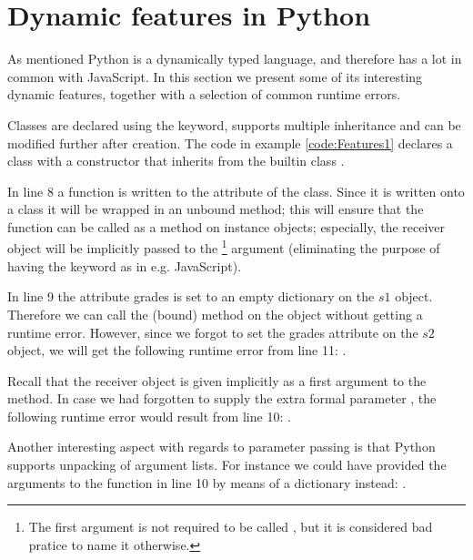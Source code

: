 \chapter{Dynamic features in Python}
\label{Features}
As mentioned Python is a dynamically typed language, and therefore has a lot in common with JavaScript. In this section we present some of its interesting dynamic features, together with a selection of common runtime errors.

Classes are declared using the  keyword, supports multiple inheritance and can be modified further after creation. 
The code in example \ref{code:Features1} declares a class  with a constructor that inherits from the builtin class .

In line 8 a function  is written to the  attribute of the  class. Since it is written onto a class it will be wrapped in an unbound method; this will ensure that the function can be called as a method on instance objects; especially, the receiver object will be implicitly passed to the \footnote{The first argument is not required to be called , but it is considered bad pratice to name it otherwise.} argument (eliminating the purpose of having the  keyword as in e.g. JavaScript).

In line 9 the attribute grades is set to an empty dictionary on the $s1$ object. Therefore we can call the (bound) method  on the  object without getting a runtime error. However, since we forgot to set the grades attribute on the $s2$ object, we will get the following runtime error from line 11: . 

Recall that the receiver object is given implicitly as a first argument to the  method. 
In case we had forgotten to supply the extra formal parameter , the following runtime error would result from line 10:
. 

Another interesting aspect with regards to parameter passing is that Python supports unpacking of argument lists. For instance we could have provided the arguments to the  function in line 10 by means of a dictionary instead: 
.

